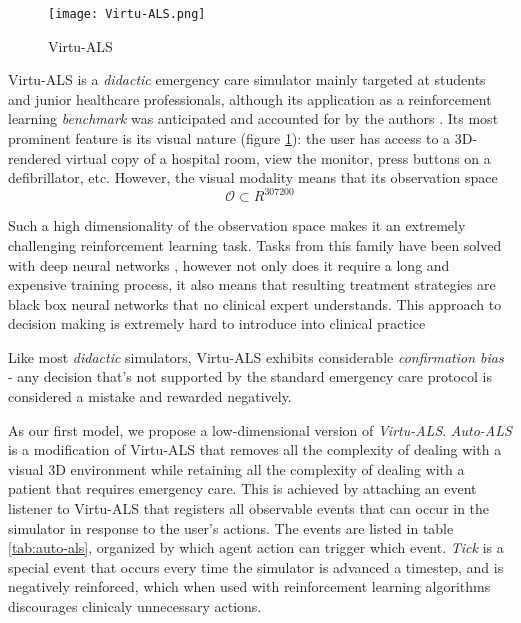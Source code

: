 
\begin{figure}
    \centering
    \texttt{[image: Virtu-ALS.png]}
    \caption{Virtu-ALS}
    \label{fig:virtu-als}
\end{figure}

Virtu-ALS is a \emph{didactic} emergency care simulator mainly targeted at students and junior healthcare professionals, although its application as a reinforcement learning \emph{benchmark} was anticipated and accounted for by the authors \cite{briskAIEnhanceInteractive2018}.
Its most prominent feature is its visual nature (figure \ref{fig:virtu-als}): the user has access to a 3D-rendered virtual copy of a hospital room, view the monitor, press buttons on a defibrillator, etc.
However, the visual modality means that its observation space 
\begin{equation}
    \mathcal{O} \subset R^{307200}
\end{equation}

Such a high dimensionality of the observation space makes it an extremely challenging reinforcement learning task.
Tasks from this family have been solved with deep neural networks \cite{mnihPlayingAtariDeep2013}, however not only does it require a long and expensive training process, it also means that resulting treatment strategies are black box neural networks that no clinical expert understands.
This approach to decision making is extremely hard to introduce into clinical practice \cite{priceBigDataBlackbox2018,watsonClinicalApplicationsMachine2019}

Like most \emph{didactic} simulators, Virtu-ALS exhibits considerable \emph{confirmation bias} - any decision that's not supported by the standard emergency care protocol \cite{thimInitialAssessmentTreatment2012} is considered a mistake and rewarded negatively.

As our first model, we propose a low-dimensional version of \emph{Virtu-ALS}.
\emph{Auto-ALS} is a modification of Virtu-ALS that removes all the complexity of dealing with a visual 3D environment while retaining all the complexity of dealing with a patient that requires emergency care.
This is achieved by attaching an event listener to Virtu-ALS that registers all observable events that can occur in the simulator in response to the user's actions.
The events are listed in table \ref{tab:auto-als}, organized by which agent action can trigger which event.
\emph{Tick} is a special event that occurs every time the simulator is advanced a timestep, and is negatively reinforced, which when used with reinforcement learning algorithms discourages clinicaly unnecessary actions.


